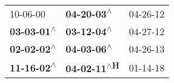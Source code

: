 \begin{supertabular}{lll}
                  10-06-00\textsuperscript{} &   \textbf{04-20-03\textsuperscript{$\wedge$}} &  04-26-12\textsuperscript{} \\
 \textbf{03-03-01\textsuperscript{$\wedge$}} &   \textbf{03-12-04\textsuperscript{$\wedge$}} &  04-27-12\textsuperscript{} \\
 \textbf{02-02-02\textsuperscript{$\wedge$}} &   \textbf{04-03-06\textsuperscript{$\wedge$}} &  04-26-13\textsuperscript{} \\
 \textbf{11-16-02\textsuperscript{$\wedge$}} &  \textbf{04-02-11\textsuperscript{$\wedge$H}} &  01-14-18\textsuperscript{} \\
\end{supertabular}
